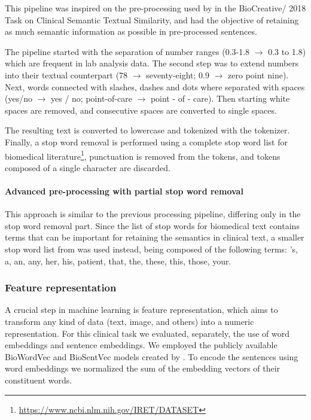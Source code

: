 This pipeline was inspired on the pre-processing used by \textcite{chen2018d} in the BioCreative/ 2018 Task on Clinical Semantic Textual Similarity, and had the objective of retaining as much semantic information as possible in pre-processed sentences.

The pipeline started with the separation of number ranges (0.3-1.8 $\rightarrow$ 0.3 to 1.8) which are frequent in lab analysis data.
The second step was to extend numbers into their textual counterpart (78 $\rightarrow$ seventy-eight; 0.9 $\rightarrow$ zero point nine).
Next, words connected with slashes, dashes and dots where separated with spaces (yes/no $\rightarrow$ yes / no; point-of-care $\rightarrow$ point - of - care).
Then starting white spaces are removed, and consecutive spaces are converted to single spaces.

The resulting text is converted to lowercase and tokenized with the  tokenizer.
Finally, a stop word removal is performed using a complete stop word list for biomedical literature\footnote{\url{https://www.ncbi.nlm.nih.gov/IRET/DATASET}}, punctuation is removed from the tokens, and tokens composed of a single character are discarded.


\paragraph{Advanced pre-processing with partial stop word removal}

This approach is similar to the previous processing pipeline, differing only in the stop word removal part.
Since the list of stop words for biomedical text contains terms that can be important for retaining the semantics in clinical text, a smaller stop word list from \textcite{luo2019a} was used instead, being composed of the following terms: 's, a, an, any, her, his, patient, that, the, these, this, those, your.


\subsubsection{Feature representation}

A crucial step in machine learning is feature representation, which aims to transform any kind of data (text, image, and others) into a numeric representation.
For this clinical  task we evaluated, separately, the use of word embeddings and sentence embeddings.
We employed the publicly available BioWordVec and BioSentVec models created by \textcite{chen2019g}.
To encode the sentences using word embeddings we normalized the sum of the embedding vectors of their constituent words.



